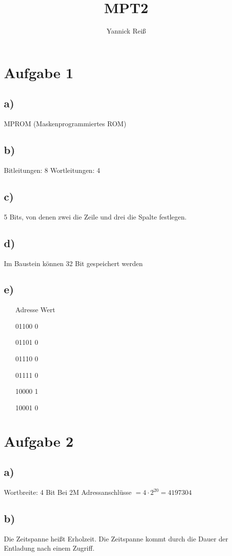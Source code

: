 \documentclass[10pt,a4paper]{article}
\author{Yannick Reiß}
\title{MPT2}
\begin{document}
\section*{Aufgabe 1}
\subsection*{a)}
MPROM (Maskenprogrammiertes ROM)

\subsection*{b)}
Bitleitungen: 8
Wortleitungen: 4

\subsection*{c)}
5 Bits, von denen zwei die Zeile und drei die Spalte festlegen.

\subsection*{d)}
Im Baustein können 32 Bit gespeichert werden

\subsection*{e)}
\begin{itemize}
\item[Adresse] Wert
\item[01100] 0
\item[01101] 0
\item[01110] 0
\item[01111] 0
\item[10000] 1
\item[10001] 0
\end{itemize}

\section{Aufgabe 2}
\subsection*{a)}
Wortbreite: 4 Bit
Bei 2M
Adressanschlüsse $= 4 \cdot 2^{20} = 4197304$

\subsection*{b)}
Die Zeitspanne heißt Erholzeit. Die Zeitspanne kommt durch die Dauer der Entladung nach einem Zugriff.
\end{document}
